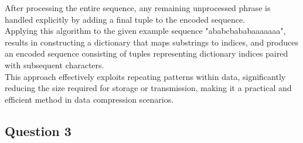 \documentclass[]{template}
\begin{document}
    \noindent
    After processing the entire sequence, any remaining unprocessed phrase is handled explicitly 
    by adding a final tuple to the encoded sequence.\\

    \noindent
    Applying this algorithm to the given example sequence "ababcbababaaaaaaa", results in constructing 
    a dictionary that maps substrings to indices, and produces an encoded sequence consisting of tuples 
    representing dictionary indices paired with subsequent characters.\\

    \noindent
    This approach effectively exploits repeating patterns within data, significantly reducing the 
    size required for storage or transmission, making it a practical and efficient method in data 
    compression scenarios.

    \subsection{Question 3}
\end{document}
